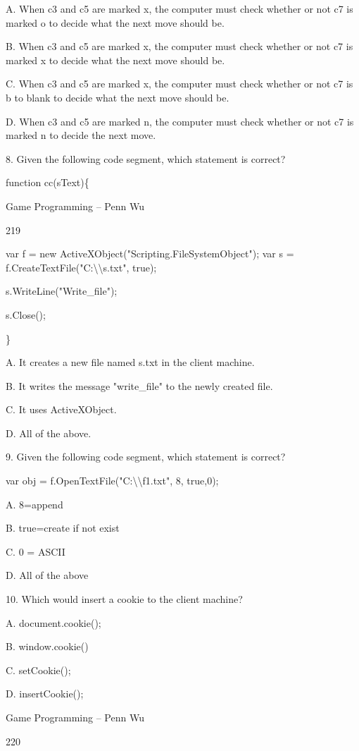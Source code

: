 \documentclass[
]{article}
\begin{document}
A. When c3 and c5 are marked x, the computer must check whether or not
c7 is marked o to decide what the next move should be.

B. When c3 and c5 are marked x, the computer must check whether or not
c7 is marked x to decide what the next move should be.

C. When c3 and c5 are marked x, the computer must check whether or not
c7 is b to blank to decide what the next move should be.

D. When c3 and c5 are marked n, the computer must check whether or not
c7 is marked n to decide the next move.

8. Given the following code segment, which statement is correct?

function cc(sText)\{

Game Programming -- Penn Wu

219

\protect\hypertarget{index_split_011.htmlux5cux23p220}{}{}var f = new
ActiveXObject("Scripting.FileSystemObject"); var s =
f.CreateTextFile("C:\textbackslash\textbackslash s.txt", true);

s.WriteLine("Write\_file");

s.Close();

\}

A. It creates a new file named s.txt in the client machine.

B. It writes the message "write\_file" to the newly created file.

C. It uses ActiveXObject.

D. All of the above.

9. Given the following code segment, which statement is correct?

var obj = f.OpenTextFile("C:\textbackslash\textbackslash f1.txt", 8,
true,0);

A. 8=append

B. true=create if not exist

C. 0 = ASCII

D. All of the above

10. Which would insert a cookie to the client machine?

A. document.cookie();

B. window.cookie()

C. setCookie();

D. insertCookie();

Game Programming -- Penn Wu

220

\protect\hypertarget{index_split_011.htmlux5cux23p221}{}{}
\end{document}
